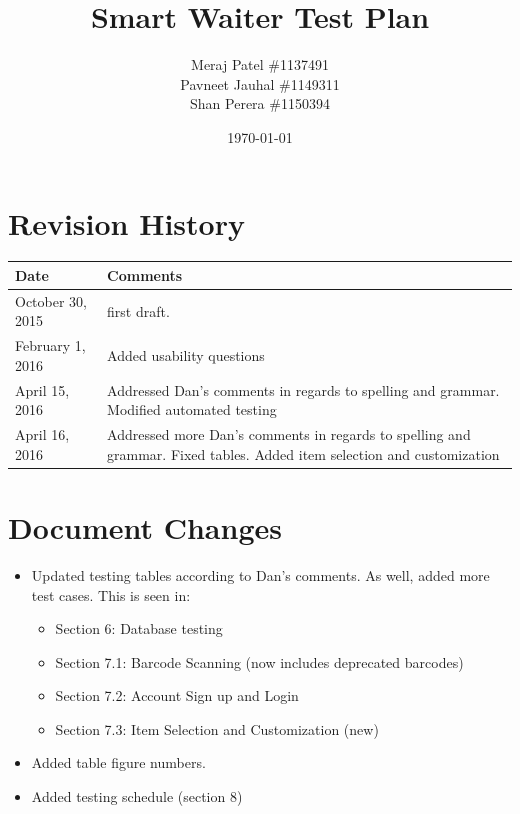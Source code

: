 \documentclass[12pt]{article}
\begin{document}
\title{Smart Waiter Test Plan} 
\author{Meraj Patel \#1137491 \\ Pavneet Jauhal \#1149311\\ Shan Perera \#1150394}
\date{\today}
\maketitle

\pagebreak

\tableofcontents

\listoftables
\section*{Revision History}
\begin{tabular}{|p{5cm}|p{5cm}|}
\hline
\textbf{Date}  & \textbf{Comments} \\ \hline
October 30, 2015 &  first draft. \\ 
February 1, 2016 &  Added usability questions \\ 
April 15, 2016 &  Addressed Dan's comments in regards to spelling and grammar. Modified automated testing \\ 
April 16, 2016 &  Addressed more Dan's comments in regards to spelling and grammar. Fixed tables. Added item selection and customization\\ 
\hline
\end{tabular}

\pagebreak

\section{Document Changes}
\begin{itemize}
 \item Updated testing tables according to Dan's comments. As well, added more test cases. This is seen in: 
 \begin{itemize}
 \item Section 6: Database testing
 \item Section 7.1: Barcode Scanning (now includes deprecated barcodes)
 \item Section 7.2: Account Sign up and Login
 \item Section 7.3: Item Selection and Customization (new)
 \end{itemize}
 \item Added table figure numbers.
 \item Added testing schedule (section 8)
 \end{itemize}
\end{document}
